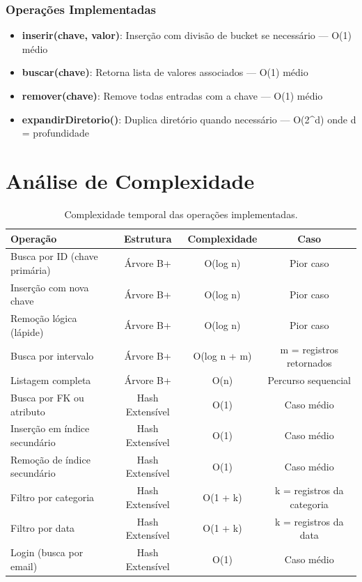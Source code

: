\documentclass[12pt,a4paper]{article}
\begin{document}
\subsubsection*{Operações Implementadas}
\begin{itemize}
  \item \textbf{inserir(chave, valor)}: Inserção com divisão de bucket se necessário — O(1) médio
  \item \textbf{buscar(chave)}: Retorna lista de valores associados — O(1) médio
  \item \textbf{remover(chave)}: Remove todas entradas com a chave — O(1) médio
  \item \textbf{expandirDiretorio()}: Duplica diretório quando necessário — O(2^d) onde d = profundidade
\end{itemize}

\section{Análise de Complexidade}

\begin{table}[H]
\centering
\small
\begin{tabular}{|l|c|c|c|}
\hline
\textbf{Operação} & \textbf{Estrutura} & \textbf{Complexidade} & \textbf{Caso} \\
\hline
Busca por ID (chave primária) & Árvore B+ & O(log n) & Pior caso \\
Inserção com nova chave & Árvore B+ & O(log n) & Pior caso \\
Remoção lógica (lápide) & Árvore B+ & O(log n) & Pior caso \\
Busca por intervalo & Árvore B+ & O(log n + m) & m = registros retornados \\
Listagem completa & Árvore B+ & O(n) & Percurso sequencial \\
\hline
Busca por FK ou atributo & Hash Extensível & O(1) & Caso médio \\
Inserção em índice secundário & Hash Extensível & O(1) & Caso médio \\
Remoção de índice secundário & Hash Extensível & O(1) & Caso médio \\
Filtro por categoria & Hash Extensível & O(1 + k) & k = registros da categoria \\
Filtro por data & Hash Extensível & O(1 + k) & k = registros da data \\
Login (busca por email) & Hash Extensível & O(1) & Caso médio \\
\hline
\end{tabular}
\caption{Complexidade temporal das operações implementadas.}
\end{table}
\end{document}
